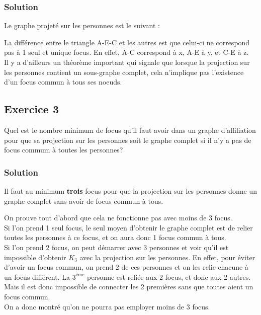     \subsubsection*{Solution}
    Le graphe projeté sur les personnes est le suivant :

    \begin{center}
    \end{center}

    La différence entre le triangle A-E-C et les autres est que celui-ci ne correspond pas à 1 seul et unique focus.
    En effet, A-C correspond à x, A-E à y, et C-E à z.\\
    Il y a d'ailleurs un théorème important qui signale que lorsque la projection sur les personnes contient un sous-graphe complet, cela n'implique pas l'existence d'un focus commun à tous ses noeuds.


\subsection*{Exercice 3}
Quel est le nombre minimum de focus qu'il faut avoir dans un graphe d'affiliation
pour que sa projection sur les personnes soit le graphe complet si il n'y a pas de focus commum \`{a} toutes les personnes?

    \subsubsection*{Solution}
    Il faut au minimum \textbf{trois} focus pour que la projection sur les personnes donne un graphe complet sans avoir de focus commun à tous.

    On prouve tout d'abord que cela ne fonctionne pas avec moins de 3 focus.\\
    Si l'on prend 1 seul focus, le seul moyen d'obtenir le graphe complet est de relier toutes les personnes à ce focus, et on aura donc 1 focus commun à tous.\\
    Si l'on prend 2 focus, on peut démarrer avec 3 personnes et voir qu'il est impossible d'obtenir $K_3$ avec la projection sur les personnes.
    En effet, pour éviter d'avoir un focus commun, on prend 2 de ces personnes et on les relie chacune à un focus différent.
    La $3^{\text{ème}}$ personne est reliée aux 2 focus, et donc aux 2 autres.
    Mais il est donc impossible de connecter les 2 premières sans que toutes aient un focus commun.\\
    On a donc montré qu'on ne pourra pas employer moins de 3 focus.

